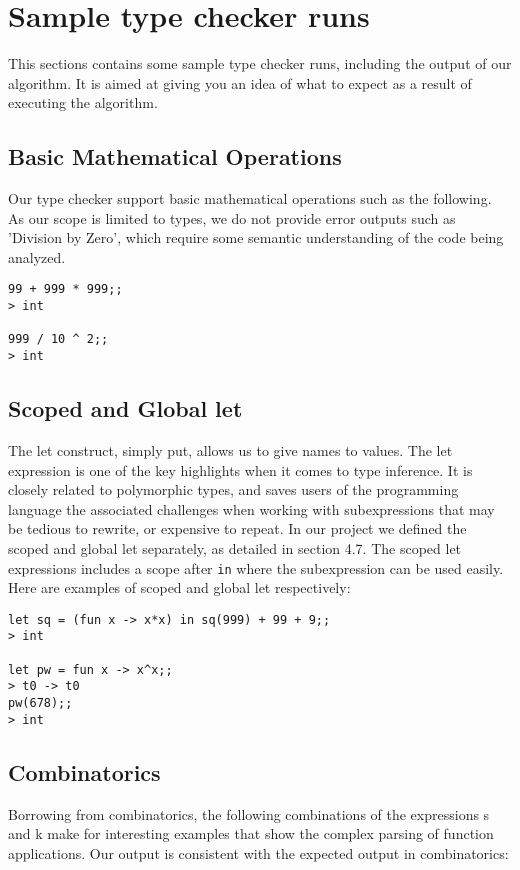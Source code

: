 \section{Sample type checker runs}
This sections contains some sample type checker runs, including the output of our algorithm. It is aimed at giving you an idea of what to expect as a result of executing the algorithm.

\subsection{Basic Mathematical Operations}
Our type checker support basic mathematical operations such as the following. As our scope is limited to types, we do not provide error outputs such as 'Division by Zero', which require some semantic understanding of the code being analyzed.

\begin{verbatim}
99 + 999 * 999;;
> int

999 / 10 ^ 2;;
> int
\end{verbatim}

\subsection{Scoped and Global let}
The let construct, simply put, allows us to give names to values. The let expression is one of the key highlights when it comes to type inference. It is closely related to polymorphic types, and saves users of the programming language the associated challenges when working with subexpressions that may be tedious to rewrite, or expensive to repeat. In our project we defined the scoped and global let separately, as detailed in section 4.7. The scoped let expressions includes a scope after \verb|in| where the subexpression can be used easily. Here are examples of scoped and global let respectively:

\begin{verbatim}
let sq = (fun x -> x*x) in sq(999) + 99 + 9;;
> int

let pw = fun x -> x^x;;
> t0 -> t0
pw(678);;
> int
\end{verbatim}

\subsection{Combinatorics}
Borrowing from combinatorics, the following combinations of the expressions s and k make for interesting examples that show the complex parsing of function applications. Our output is consistent with the expected output in combinatorics:

